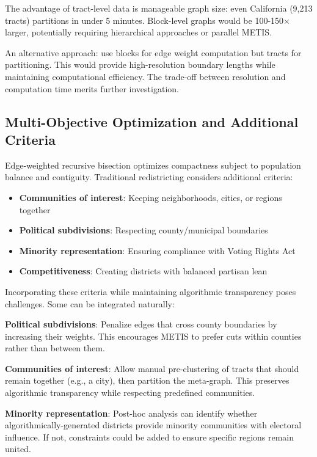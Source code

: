 The advantage of tract-level data is manageable graph size: even California (9,213 tracts) partitions in under 5 minutes. Block-level graphs would be 100-150× larger, potentially requiring hierarchical approaches or parallel METIS.

An alternative approach: use blocks for edge weight computation but tracts for partitioning. This would provide high-resolution boundary lengths while maintaining computational efficiency. The trade-off between resolution and computation time merits further investigation.

\subsection{Multi-Objective Optimization and Additional Criteria}

Edge-weighted recursive bisection optimizes compactness subject to population balance and contiguity. Traditional redistricting considers additional criteria:

\begin{itemize}
\item \textbf{Communities of interest}: Keeping neighborhoods, cities, or regions together
\item \textbf{Political subdivisions}: Respecting county/municipal boundaries
\item \textbf{Minority representation}: Ensuring compliance with Voting Rights Act
\item \textbf{Competitiveness}: Creating districts with balanced partisan lean
\end{itemize}

Incorporating these criteria while maintaining algorithmic transparency poses challenges. Some can be integrated naturally:

\textbf{Political subdivisions}: Penalize edges that cross county boundaries by increasing their weights. This encourages METIS to prefer cuts within counties rather than between them.

\textbf{Communities of interest}: Allow manual pre-clustering of tracts that should remain together (e.g., a city), then partition the meta-graph. This preserves algorithmic transparency while respecting predefined communities.

\textbf{Minority representation}: Post-hoc analysis can identify whether algorithmically-generated districts provide minority communities with electoral influence. If not, constraints could be added to ensure specific regions remain united.

